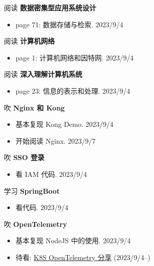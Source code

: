 \documentclass[a4,10pt]{ctexart}
\begin{document}
\begin{yd}{阅读 \textbf{数据密集型应用系统设计}}{}
	\begin{itemize}[noitemsep]
		\item page 71: 数据存储与检索. 2023/9/4
	\end{itemize}
\end{yd}

\begin{yd}{阅读 \textbf{计算机网络}}{}
	\begin{itemize}[noitemsep]
		\item page 1: 计算机网络和因特网. 2023/9/4
	\end{itemize}
\end{yd}

\begin{yd}{阅读 \textbf{深入理解计算机系统}}{}
	\begin{itemize}[noitemsep]
		\item page 23: 信息的表示和处理. 2023/9/4
	\end{itemize}
\end{yd}

\begin{yd}{吹 \textbf{Nginx 和 Kong}}{}
	\begin{itemize}[noitemsep]
		\item 基本复现 Kong Demo. 2023/9/4
		\item 开始阅读 Nginx. 2023/9/7
	\end{itemize}
\end{yd}

\begin{yd}{吹 \textbf{SSO 登录}}{}
	\begin{itemize}[noitemsep]
		\item 看 IAM 代码. 2023/9/4
	\end{itemize}
\end{yd}

\begin{yd}{学习 \textbf{SpringBoot}}{}
	\begin{itemize}[noitemsep]
		\item 看代码. 2023/9/4
	\end{itemize}
\end{yd}

\begin{yd}{吹 \textbf{OpenTelemetry}}{}
	\begin{itemize}[noitemsep]
		\item 基本复现 NodeJS 中的使用. 2023/9/4
		\item 待看: \href{https://www.bilibili.com/video/BV1cN411a72d/?vd_source=3d6137a386838c2bcb88b1db7c993448}{K8S OpenTelemetry 分享} (2023/9/4--)
	\end{itemize}
\end{yd}
\end{document}
